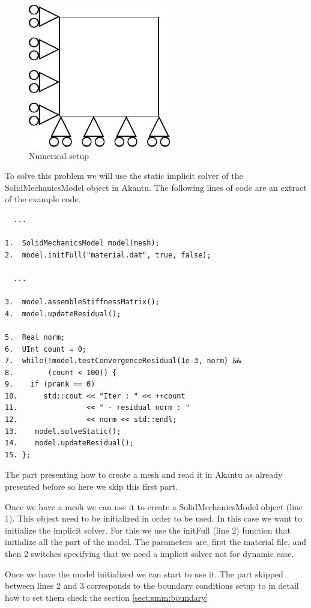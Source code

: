 \documentclass[a4paper,11pt]{book}
\begin{document}
\begin{figure}[!htb]
  \centering
  \includegraphics{figures/implicit_static}
  \caption{Numerical setup\label{fig:smm:implicit:static}}
\end{figure}

To  solve  this  problem  we  will   use  the  static  implicit  solver  of  the
SolidMechanicsModel object in Akantu. The following lines of code are an extract
of the example code.

\begin{verbatim}
  ...

1.  SolidMechanicsModel model(mesh);
2.  model.initFull("material.dat", true, false);

  ...

3.  model.assembleStiffnessMatrix();
4.  model.updateResidual();

5.  Real norm;
6.  UInt count = 0;
7.  while(!model.testConvergenceResidual(1e-3, norm) &&
8.        (count < 100)) {
9.    if (prank == 0)
10.      std::cout << "Iter : " << ++count
11.                << " - residual norm : "
12.                << norm << std::endl;
13.    model.solveStatic();
14.    model.updateResidual();
15. };
\end{verbatim}

The  part presenting  how to  create a  mesh and  read it  in Akantu  as already
presented before so here we skip this first part.

Once we have a  mesh we can use it to create  a SolidMechanicsModel object (line
1). This object need to be initialized in order to be used. In this case we want
to  initialize the  implicit solver.   For  this we  use the  initFull (line  2)
function that  initialize all the part  of the model. The  parameters are, first
the material file, and then 2 switches specifying that we need a implicit solver
not for dynamic case.

Once we  have the model  initialized we  can start to  use it. The  part skipped
between lines 2 and 3 corresponds  to the boundary conditions setup to in detail
how to set them check the section \ref{sect:smm:boundary}
\end{document}
